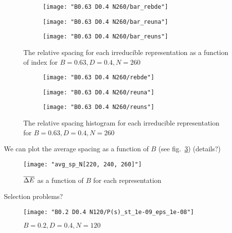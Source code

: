 \documentclass[../thesis.tex]{subfiles}
\begin{document}
\begin{figure}
  \centering
  \begin{subfigure}[b]{0.49\textwidth}
    \centering
    \texttt{[image: "B0.63 D0.4 N260/bar\_rebde"]}
  \end{subfigure}
  \begin{subfigure}[b]{0.49\textwidth}
    \centering
    \texttt{[image: "B0.63 D0.4 N260/bar\_reuna"]}
  \end{subfigure}
  \begin{subfigure}[b]{0.49\textwidth}
    \centering
    \texttt{[image: "B0.63 D0.4 N260/bar\_reuns"]}
  \end{subfigure}
  \caption{The relative spacing for each irreducible representation as a function
  of index for \(B=0.63, D=0.4, N=260\)}
  \label{fig:bar-rep-b0.63n260}  %
\end{figure}

\begin{figure}
  \centering
  \begin{subfigure}[b]{0.49\textwidth}
    \centering
    \texttt{[image: "B0.63 D0.4 N260/rebde"]}
  \end{subfigure}
  \begin{subfigure}[b]{0.49\textwidth}
    \centering
    \texttt{[image: "B0.63 D0.4 N260/reuna"]}
  \end{subfigure}
  \begin{subfigure}[b]{0.49\textwidth}
    \centering
    \texttt{[image: "B0.63 D0.4 N260/reuns"]}
  \end{subfigure}
  \caption{The relative spacing histogram for each irreducible representation for
  \(B=0.63, D=0.4, N=260\)}
\label{fig:hist-rep-b0.63n260}
\end{figure}

We can plot the average spacing as a function of $B$ (see fig.~\ref{fig:avgsp})
{\color{red} (details?)}

\begin{figure}
  \centering
  \texttt{[image: "avg\_sp\_N[220, 240, 260]"]}
  \caption{\(\overline{\Delta E}\) as a function of $B$ for each representation}
\label{fig:avgsp}
\end{figure}

{\color{red} Selection problems?}



\begin{figure}
  \texttt{[image: "B0.2 D0.4 N120/P(s)\_st\_1e-09\_eps\_1e-08"]}  %
  \caption{\(B=0.2, D=0.4, N=120\)}
\label{fig:P(s)-b0.2n120}
\end{figure}
\end{document}
